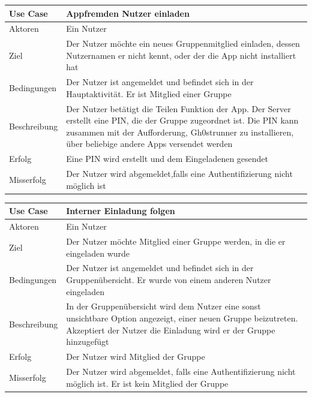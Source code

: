 \begin{tabular}{|p{}|p{}|}
\hline
\textbf{Use Case} & \textbf{Appfremden Nutzer einladen} \\ \hline
Aktoren &  Ein Nutzer \\ \hline
Ziel &  Der Nutzer möchte ein neues Gruppenmitglied einladen, dessen Nutzernamen er nicht kennt, oder der die App nicht installiert hat \\ \hline
Bedingungen &  Der Nutzer ist angemeldet und befindet sich in der Hauptaktivität. Er ist Mitglied einer Gruppe \\ \hline
Beschreibung & Der Nutzer betätigt die Teilen Funktion der App. Der Server erstellt eine PIN, die der Gruppe zugeordnet ist. Die PIN kann zusammen mit der Aufforderung, Gh0strunner zu installieren, über beliebige andere Apps versendet werden \\ \hline
Erfolg & Eine PIN wird erstellt und dem Eingeladenen gesendet \\ \hline
Misserfolg & Der Nutzer wird abgemeldet,falls eine Authentifizierung nicht möglich ist \\ \hline
\hline \end{tabular}
\begin{tabular}{|p{}|p{}|}
\hline
\textbf{Use Case} & \textbf{Interner Einladung folgen} \\ \hline
Aktoren &  Ein Nutzer \\ \hline
Ziel &  Der Nutzer möchte Mitglied einer Gruppe werden, in die er eingeladen wurde \\ \hline
Bedingungen &  Der Nutzer ist angemeldet und befindet sich in der Gruppenübersicht. Er wurde von einem anderen Nutzer eingeladen \\ \hline
Beschreibung & In der Gruppenübersicht wird dem Nutzer eine sonst unsichtbare Option angezeigt, einer neuen Gruppe beizutreten. Akzeptiert der Nutzer die Einladung wird er der Gruppe hinzugefügt \\ \hline
Erfolg & Der Nutzer wird Mitglied der Gruppe \\ \hline
Misserfolg & Der Nutzer wird abgemeldet, falls eine Authentifizierung nicht möglich ist. Er ist kein Mitglied der Gruppe \\ \hline
\hline \end{tabular}
